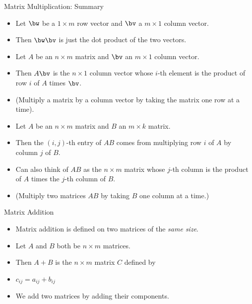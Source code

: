\documentclass{beamer}
\begin{document}
\begin{frame}{Matrix Multiplication: Summary}

\begin{itemize}
\item Let $\bw$ be a $1\times m$ row vector and $\bv$ a $m\times 1$ column vector.
\item Then $\bw \bv$ is just the dot product of the two vectors.
\item Let $A$ be an $n\times m$ matrix and $\bv$ an $m\times 1$ column vector.
\item Then $A \bv$ is the $n\times 1$ column vector whose $i$-th element is
the product of row $i$ of $A$ times $\bv$.
\item (Multiply a matrix by a column vector by taking the matrix one row at a time).
\item Let $A$ be an $n\times m$ matrix and $B$ an $m\times k$ matrix.
\item Then the $(i,j)$-th entry of $A B$ comes from multiplying row $i$ of $A$
by column $j$ of $B$.
\item Can also think of $A B$ as the $n \times m$ matrix whose $j$-th column is the product
of $A$ times the $j$-th column of $B$.
\item (Multiply two matrices $A B$ by taking $B$ one column at a time.)
\end{itemize}


\end{frame}


\begin{frame}{Matrix Addition}

\begin{itemize}
\item Matrix addition is defined on two matrices of the \emph{same size}.
\item Let $A$ and $B$ both be $n\times m$ matrices.
\item Then $A + B$ is the $n \times m$ matrix $C$ defined by
\item $c_{ij} = a_{ij} + b_{ij}$
\item We add two matrices by adding their components.
\end{itemize}


\end{frame}

\end{document}
